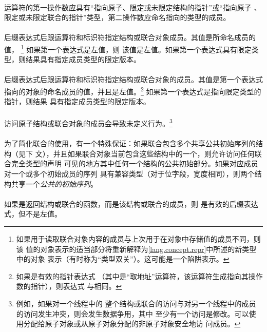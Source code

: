\paragraph{}
运算符\tm{->}的第一操作数应具有``指向原子、限定或未限定结构的指针''或``指向原子
、限定或未限定联合的指针''类型，第二操作数应命名指向的类型的成员。

\semantic
\paragraph{}
后缀表达式后跟运算符和标识符指定结构或联合对象成员。其值是所命名成员的值，
\footnote{如果用于读取联合对象内容的成员与上次用于在对象中存储值的成员不同，则该
值的对象表示的适当部分将重新解释为\ref{lang.concept.repr}中所述的新类型中的对象
表示（有时称为``类型双关''）。这可能是一个陷阱表示。} 如果第一个表达式是左值，则
该值是左值。如果第一个表达式具有限定类型，则结果具有指定成员类型的限定版本。

\paragraph{}
后缀表达式后跟\tm{->}运算符和标识符指定结构或联合对象的成员。其值是第一个表达式
指向的对象的命名成员的值，并且是左值。\footnote{如果是有效的指针表达式
（其中\tm{\&}是``取地址''运算符，该运算符生成指向其操作数的指针），则表达式
与相同。} 如果第一个表达式是指向限定类型的指针，则结果
具有指定成员类型的限定版本。

\paragraph{}
访问原子结构或联合对象的成员会导致未定义行为。\footnote{例如，如果对一个线程中的
整个结构或联合的访问与对另一个线程中的成员的访问发生冲突，则会发生数据争用，其中
至少有一个访问是修改。可以使用分配给原子对象或从原子对象分配的非原子对象安全地访
问成员。}

\paragraph{}
为了简化联合的使用，有一个特殊保证：如果联合包含多个共享公共初始序列的结构（见下
文），并且如果联合对象当前包含这些结构中的一个，则允许访问任何联合完全类型的声明
可见的地方其中任何一个结构的公共初始部分。如果对应成员对一个或多个初始成员的序列
具有兼容类型（对于位字段，宽度相同），则两个结构共享一个\textit{公共的初始序列}。

\paragraph{}
\ex 如果是返回结构或联合的函数，而是该结构或联合的成员，则
是有效的后缀表达式，但不是左值。

